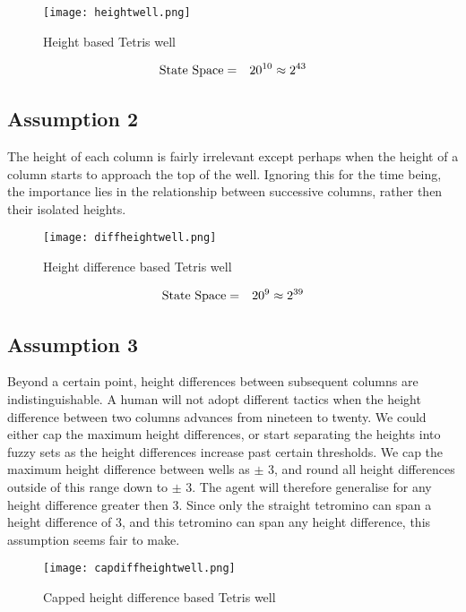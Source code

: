 \documentclass{rucsthesis}
\begin{document}
\begin{figure}[h]
\centering
\texttt{[image: heightwell.png]}
\caption{Height based Tetris well}
\label{fig:heightwell}
\end{figure}

\begin{eqnarray}
\centering
\textrm{State Space} & = & 20^{10} \approx 2^{43}
\end{eqnarray}

\subsection*{Assumption 2}

The height of each column is fairly irrelevant except perhaps when the height of a column starts to approach the top of the well. Ignoring this for the time being, the importance lies in the relationship between successive columns, rather then their isolated heights.

\begin{figure}[h]
\centering
\texttt{[image: diffheightwell.png]}
\caption{Height difference based Tetris well}
\label{fig:diffheightwell}
\end{figure}

\begin{eqnarray}
\centering
\textrm{State Space} & = & 20^{9} \approx 2^{39}
\end{eqnarray}

\subsection*{Assumption 3}

Beyond a certain point, height differences between subsequent columns are indistinguishable. A human will not adopt different tactics when the height difference between two columns advances from nineteen to twenty. We could either cap the maximum height differences, or start separating the heights into fuzzy sets as the height differences increase past certain thresholds. We cap the maximum height difference between wells as $\pm$ 3, and round all height differences outside of this range down to $\pm$ 3. The agent will therefore generalise for any height difference greater then 3. Since only the straight tetromino can span a height difference of 3, and this tetromino can span any height difference, this assumption seems fair to make. 

\begin{figure}[h]
\centering
\texttt{[image: capdiffheightwell.png]}
\caption{Capped height difference based Tetris well}
\label{fig:capdiffheightwell}
\end{figure}
\end{document}
